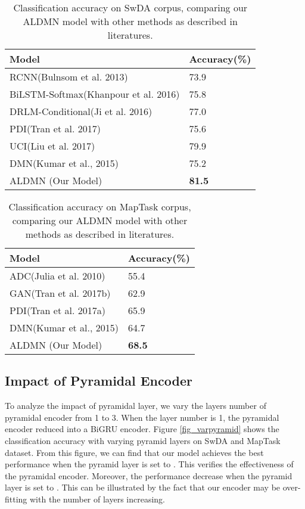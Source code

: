 \documentclass[conference]{IEEEtran}
\begin{document}
\begin{table}[!t]
		\centering
		\begin{tabular}{p{5.4cm}p{1.2cm}}
			\hline
			Model &Accuracy(\%)\\
			\hline
			RCNN(Bulnsom et al. 2013)&73.9\\
			BiLSTM-Softmax(Khanpour et al. 2016)&75.8\\
			DRLM-Conditional(Ji et al. 2016)&77.0\\
			PDI(Tran et al. 2017)&75.6 \\
			UCI(Liu et al. 2017)&79.9\\
			DMN(Kumar et al., 2015) & 75.2\\
			\hline
			ALDMN (Our Model) & \textbf{81.5} \\
			\hline
		\end{tabular}
		\caption{Classification accuracy on SwDA corpus, comparing our ALDMN model with other methods as described in literatures.}
		\label{table:result_1}
	\end{table}
	
	\begin{table}[!t]
		\centering
		\begin{tabular}{p{5.4cm}p{1.2cm}}\hline
			Model &Accuracy(\%)\\
			\hline
			ADC(Julia et al. 2010)&55.4\\
			GAN(Tran et al. 2017b)&62.9 \\
			PDI(Tran et al. 2017a)&65.9\\
			DMN(Kumar et al., 2015)&64.7\\
			\hline
			ALDMN (Our Model) & \textbf{68.5} \\
			\hline
		\end{tabular}
		\caption{Classification accuracy on MapTask corpus, comparing our ALDMN model with other methods as described in literatures.}	
		\label{table:result_2}
	\end{table}
	
	
\subsection{Impact of Pyramidal Encoder}
	To analyze the impact of pyramidal layer, we vary the layers number of pyramidal encoder from 1 to 3. When the layer number is 1, the pyramidal encoder reduced into a BiGRU encoder. Figure \ref{fig_varpyramid} shows the classification accuracy with varying pyramid layers on SwDA and MapTask dataset. 
	From this figure, we can find that our model achieves the best performance when the pyramid layer is set to . This verifies the effectiveness of the pyramidal encoder. Moreover, the performance decrease when the pyramid layer is set to . This can be illustrated by the fact that our encoder may be over-fitting with the number of layers increasing.
	
\end{document}

